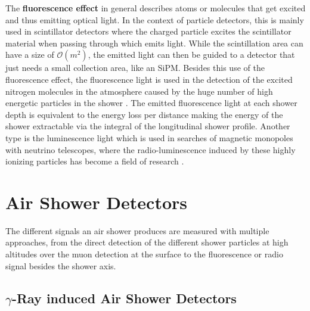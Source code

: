 The \textbf{fluorescence effect} in general describes atoms or molecules that get excited and thus emitting optical light.
In the context of particle detectors, this is mainly used in scintillator detectors where the charged particle excites the scintillator material when passing through which emits light.
While the scintillation area can have a size of $\mathcal{O}(m^2)$, the emitted light can then be guided to a detector that just needs a small collection area, like an SiPM.
Besides this use of the fluorescence effect, the fluorescence light is used in the detection of the excited nitrogen molecules in the atmosphere caused by the huge number of high energetic particles in the shower \cite{Keilhauer12Fluorescence}.
The emitted fluorescence light at each shower depth is equivalent to the energy loss per distance making the energy of the shower extractable via the integral of the longitudinal shower profile.
Another type is the luminescence light which is used in searches of magnetic monopoles with neutrino telescopes, where the radio-luminescence induced by these highly ionizing particles has become a field of research \cite{Pollmann19Luminescence}.

%
% 
%
%

\section{Air Shower Detectors}

The different signals an air shower produces are measured with multiple approaches, from the direct detection of the different shower particles at high altitudes over the muon detection at the surface to the fluorescence or radio signal besides the shower axis.

\subsection{$\gamma$-Ray induced Air Shower Detectors}

